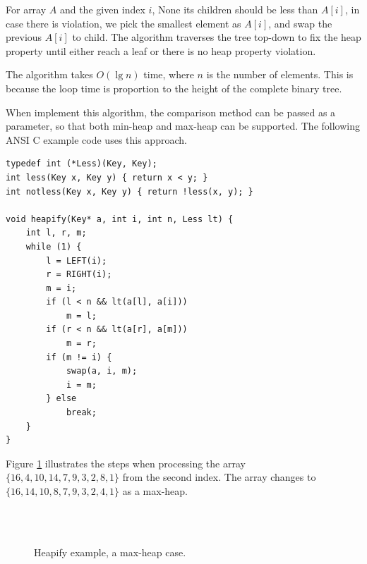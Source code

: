 \documentclass[b5paper]{article}
\begin{document}
For array $A$ and the given index $i$, None its children
should be less than $A[i]$, in case there is violation, we pick the smallest
element as $A[i]$, and swap the previous $A[i]$ to child.
The algorithm traverses the tree top-down to fix the heap property
until either reach a leaf or there is no heap property violation.

The  algorithm takes $O(\lg n)$ time, where
$n$ is the number of elements. This
is because the loop time is proportion to the height of the complete binary tree.

When implement this algorithm, the comparison method can be passed as
a parameter, so that both min-heap and max-heap can be supported.
The following ANSI C example code uses this approach.

\begin{lstlisting}
typedef int (*Less)(Key, Key);
int less(Key x, Key y) { return x < y; }
int notless(Key x, Key y) { return !less(x, y); }

void heapify(Key* a, int i, int n, Less lt) {
    int l, r, m;
    while (1) {
        l = LEFT(i);
        r = RIGHT(i);
        m = i;
        if (l < n && lt(a[l], a[i]))
            m = l;
        if (r < n && lt(a[r], a[m]))
            m = r;
        if (m != i) {
            swap(a, i, m);
            i = m;
        } else
            break;
    }
}
\end{lstlisting}

Figure \ref{fig:heapify} illustrates the steps when  processing the
array $\{16, 4, 10, 14, 7, 9, 3, 2, 8, 1\}$ from the second index. The array changes to
$\{16, 14, 10, 8, 7, 9, 3, 2, 4, 1\}$ as a max-heap.

\begin{figure}[htbp]
    \centering
     \\
     \\
    \caption{Heapify example, a max-heap case.} \label{fig:heapify}
\end{figure}


\end{document}
